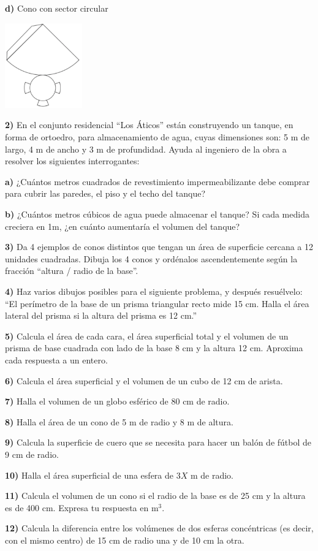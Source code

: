 \documentclass[12pt,a4paper]{article}
\begin{document}
\begin{multicols}{2}
\textbf{d)} Cono con sector circular

\begin{center}
\includegraphics[width=0.25\textwidth]{Figuras/fig82.png}
\end{center}

\vspace{2mm}

\textbf{2)} En el conjunto residencial ``Los Áticos'' están construyendo un tanque, en forma de ortoedro, para almacenamiento de agua, cuyas dimensiones son: 5 m de largo, 4 m de ancho y 3 m de profundidad. Ayuda al ingeniero de la obra a resolver los siguientes interrogantes:

\textbf{a)} ¿Cuántos metros cuadrados de revestimiento impermeabilizante debe comprar para cubrir las paredes, el piso y el techo del tanque?

\textbf{b)} ¿Cuántos metros cúbicos de agua puede almacenar el tanque? Si cada medida creciera en 1m, ¿en cuánto aumentaría el volumen del tanque?

\textbf{3)} Da 4 ejemplos de conos distintos que tengan un área de superficie cercana a 12 unidades cuadradas. Dibuja los 4 conos y ordénalos ascendentemente según la fracción ``altura / radio de la base''.

\textbf{4)} Haz varios dibujos posibles para el siguiente problema, y después resuélvelo: ``El perímetro de la base de un prisma triangular recto mide 15 cm. Halla el área lateral del prisma si la altura del prisma es 12 cm.''

\textbf{5)} Calcula el área de cada cara, el área superficial total y el volumen de un prisma de base cuadrada con lado de la base 8 cm y la altura 12 cm. Aproxima cada respuesta a un entero.

\textbf{6)} Calcula el área superficial y el volumen de un cubo de 12 cm de arista.

\textbf{7)} Halla el volumen de un globo esférico de 80 cm de radio.

\textbf{8)} Halla el área de un cono de 5 m de radio y 8 m de altura.

\textbf{9)} Calcula la superficie de cuero que se necesita para hacer un balón de fútbol de 9 cm de radio.

\textbf{10)} Halla el área superficial de una esfera de $3X$ m de radio.

\textbf{11)} Calcula el volumen de un cono si el radio de la base es de 25 cm y la altura es de 400 cm. Expresa tu respuesta en m$^3$.

\textbf{12)} Calcula la diferencia entre los volúmenes de dos esferas concéntricas (es decir, con el mismo centro) de 15 cm de radio una y de 10 cm la otra.

\end{multicols}
\end{document}
